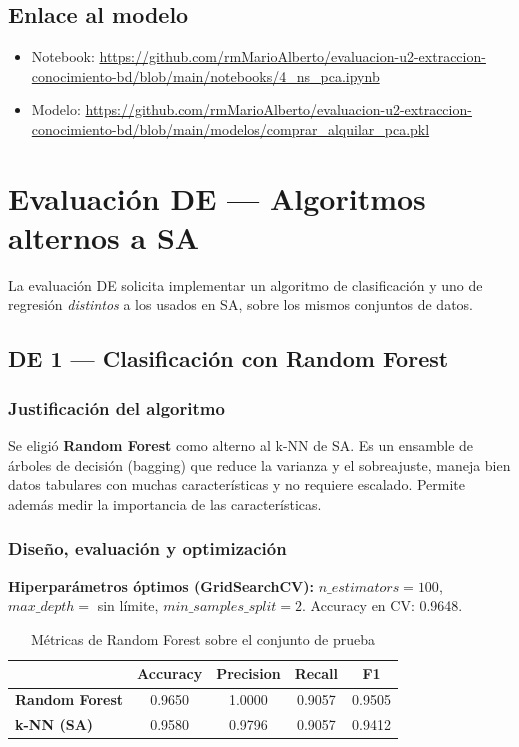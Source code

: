 \documentclass[12pt,a4paper]{article}
\begin{document}
\subsection{Enlace al modelo}
\begin{itemize}
\item Notebook: \url{https://github.com/rmMarioAlberto/evaluacion-u2-extraccion-conocimiento-bd/blob/main/notebooks/4_ns_pca.ipynb}
\item Modelo: \url{https://github.com/rmMarioAlberto/evaluacion-u2-extraccion-conocimiento-bd/blob/main/modelos/comprar_alquilar_pca.pkl}
\end{itemize}

\section{Evaluación DE — Algoritmos alternos a SA}

La evaluación DE solicita implementar un algoritmo de clasificación y uno de
regresión \emph{distintos} a los usados en SA, sobre los mismos conjuntos de datos.

\subsection{DE 1 — Clasificación con Random Forest}

\subsubsection{Justificación del algoritmo}
Se eligió \textbf{Random Forest} como alterno al k-NN de SA. Es un ensamble de
árboles de decisión (bagging) que reduce la varianza y el sobreajuste, maneja bien
datos tabulares con muchas características y no requiere escalado. Permite además
medir la importancia de las características.

\subsubsection{Diseño, evaluación y optimización}
\textbf{Hiperparámetros óptimos (GridSearchCV):} $n\_estimators=100$,
$max\_depth=$ sin límite, $min\_samples\_split=2$. Accuracy en CV: 0.9648.

\begin{table}[H]
\centering
\caption{Métricas de Random Forest sobre el conjunto de prueba}
\small\setlength{\tabcolsep}{5pt}\begin{tabular}{lcccc}
\toprule
 & \textbf{Accuracy} & \textbf{Precision} & \textbf{Recall} & \textbf{F1} \\
\midrule
\textbf{Random Forest} & 0.9650 & 1.0000 & 0.9057 & 0.9505 \\
\textbf{k-NN (SA)} & 0.9580 & 0.9796 & 0.9057 & 0.9412 \\
\bottomrule
\end{tabular}
\end{table}
\end{document}
